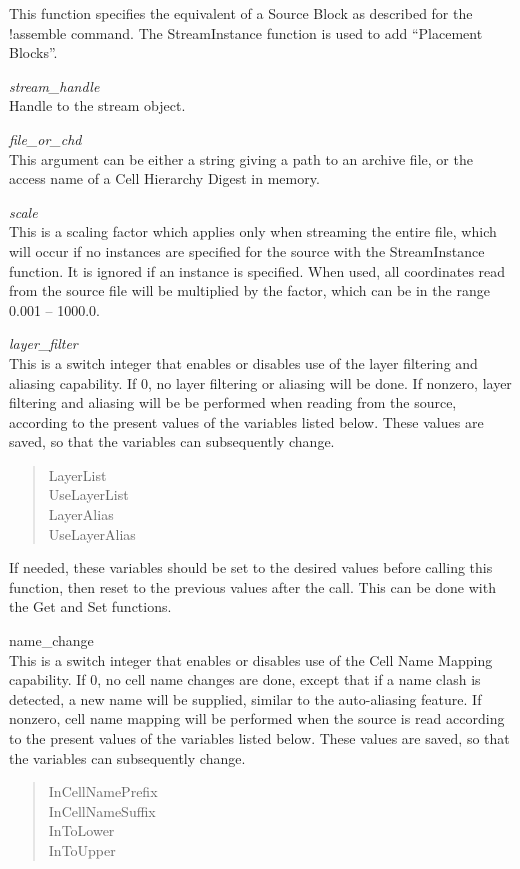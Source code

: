 \begin{description}
This function specifies the equivalent of a Source Block as described
for the {\cb !assemble} command.  The {\vt StreamInstance} function is
used to add ``Placement Blocks''.

\begin{description}
\item{\it stream\_handle}\\
Handle to the stream object.

\item{\it file\_or\_chd}\\
This argument can be either a string giving a path to an archive
file, or the access name of a Cell Hierarchy Digest in memory.

\item{\it scale}\\
This is a scaling factor which applies only when streaming the entire
file, which will occur if no instances are specified for the source
with the {\vt StreamInstance} function.  It is ignored if an
instance is specified.  When used, all coordinates read from the
source file will be multiplied by the factor, which can be in the
range 0.001 -- 1000.0.

\item{\it layer\_filter}\\
This is a switch integer that enables or disables use of the layer
filtering and aliasing capability.  If 0, no layer filtering or
aliasing will be done.  If nonzero, layer filtering and aliasing will
be be performed when reading from the source, according to the present
values of the variables listed below.  These values are saved, so that
the variables can subsequently change.
\begin{quote} \vt
LayerList\\
UseLayerList\\
LayerAlias\\
UseLayerAlias
\end{quote}

If needed, these variables should be set to the desired values before
calling this function, then reset to the previous values after the
call.  This can be done with the {\vt Get} and {\vt Set} functions.

\item{name\_change}\\
This is a switch integer that enables or disables use of the Cell Name
Mapping capability.  If 0, no cell name changes are done, except that
if a name clash is detected, a new name will be supplied, similar to
the auto-aliasing feature.  If nonzero, cell name mapping will be
performed when the source is read according to the present values of
the variables listed below.  These values are saved, so that the
variables can subsequently change.
\begin{quote} \vt
InCellNamePrefix\\
InCellNameSuffix\\
InToLower\\
InToUpper
\end{quote}


\end{description}
\end{description}

